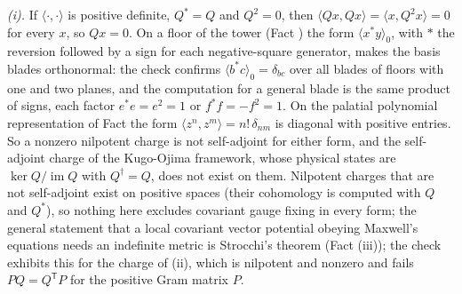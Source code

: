 \emph{(i).} If $\langle\cdot,\cdot\rangle$ is positive definite, $Q^{*} = Q$ and $Q^2 = 0$, then $\langle Qx, Qx\rangle = \langle x, Q^2x\rangle = 0$ for every $x$, so $Qx = 0$. On a floor of the tower (Fact ) the form $\langle x^{*}y\rangle_0$, with $*$ the reversion followed by a sign for each negative-square generator, makes the basis blades orthonormal: the check confirms $\langle b^{*}c\rangle_0 = \delta_{bc}$ over all blades of floors with one and two planes, and the computation for a general blade is the same product of signs, each factor $e^{*}e = e^2 = 1$ or $f^{*}f = -f^2 = 1$. On the palatial polynomial representation of Fact  the form $\langle z^n, z^m\rangle = n!\,\delta_{nm}$ is diagonal with positive entries. So a nonzero nilpotent charge is not self-adjoint for either form, and the self-adjoint charge of the Kugo-Ojima framework, whose physical states are $\ker Q/\operatorname{im}Q$ with $Q^{\dagger} = Q$, does not exist on them. Nilpotent charges that are not self-adjoint exist on positive spaces (their cohomology is computed with $Q$ and $Q^{*}$), so nothing here excludes covariant gauge fixing in every form; the general statement that a local covariant vector potential obeying Maxwell's equations needs an indefinite metric is Strocchi's theorem (Fact (iii)); the check exhibits this for the charge of (ii), which is nilpotent and nonzero and fails $PQ = Q^{\mathsf T}P$ for the positive Gram matrix $P$.

